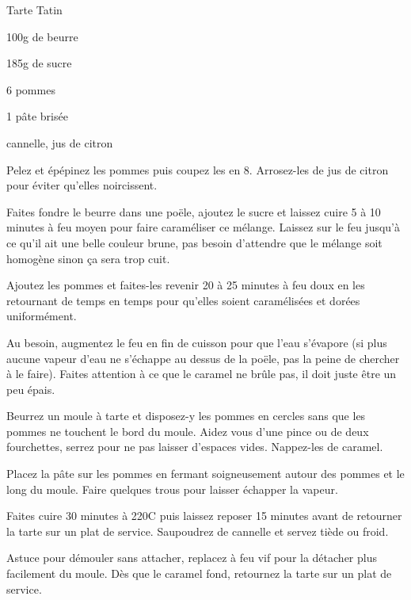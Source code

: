 \begin{recette}{Tarte Tatin}
\begin{ingredients}
\item 100g de beurre
\item 185g de sucre
\item 6 pommes
\item 1 pâte brisée
\item cannelle, jus de citron
\end{ingredients}

\begin{preparation}
\item Pelez et épépinez les pommes puis coupez les en 8. Arrosez-les de jus de citron pour éviter qu'elles noircissent.
\item Faites fondre le beurre dans une poële, ajoutez le sucre et laissez cuire 5 à 10 minutes à feu moyen pour faire caraméliser ce mélange. Laissez sur le feu jusqu'à ce qu'il ait une belle couleur brune, pas besoin d'attendre que le mélange soit homogène sinon ça sera trop cuit. 
\item Ajoutez les pommes et faites-les revenir 20 à 25 minutes à feu doux en les retournant de temps en temps pour qu'elles soient caramélisées et dorées uniformément.
\begin{remarque}
Au besoin, augmentez le feu en fin de cuisson pour que l'eau s'évapore (si plus aucune vapeur d'eau ne s'échappe au dessus de la poële, pas la peine de chercher à le faire). Faites attention à ce que le caramel ne brûle pas, il doit juste être un peu épais. 
\end{remarque}

\item Beurrez un moule à tarte et disposez-y les pommes en cercles sans que les pommes ne touchent le bord du moule. Aidez vous d'une pince ou de deux fourchettes, serrez pour ne pas laisser d'espaces vides. Nappez-les de caramel. 
\item Placez la pâte sur les pommes en fermant soigneusement autour des pommes et le long du moule. Faire quelques trous pour laisser échapper la vapeur.
\end{preparation}

\begin{cuisson}
Faites cuire 30 minutes à 220\degres C puis laissez reposer 15 minutes avant de retourner la tarte sur un plat de service. Saupoudrez de cannelle et servez tiède ou froid.

\begin{remarque}
Astuce pour démouler sans attacher, replacez à feu vif pour la détacher plus facilement du moule. Dès que le caramel fond, retournez la tarte sur un plat de service.
\end{remarque}
\end{cuisson}
\end{recette}

